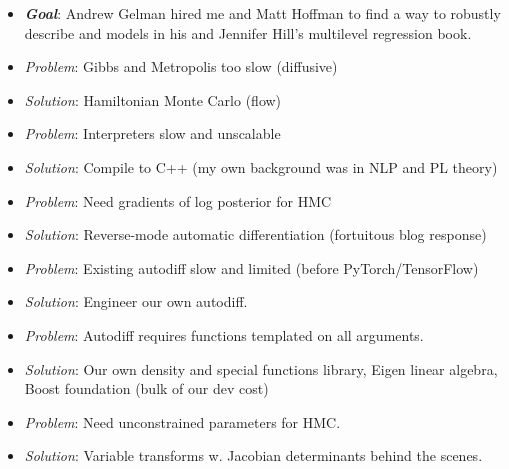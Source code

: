 \documentclass[10pt]{report}
\begin{document}
%
\begin{itemize}
\item {\slshape\bfseries Goal}: Andrew Gelman hired me and Matt Hoffman to find a way to robustly describe and models in his and Jennifer Hill's multilevel regression book.
\end{itemize}
%
\vspace*{2pt}
\begin{itemize}
\item {\slshape Problem}: Gibbs and Metropolis too slow (diffusive)
\item {\slshape Solution}: Hamiltonian Monte Carlo (flow)
%
\vspace*{8pt}
\item {\slshape Problem}:  Interpreters slow and unscalable
\item {\slshape Solution}: Compile to C++ (my own background was in NLP and PL theory)
%
\vspace*{8pt}
\item {\slshape Problem}:  Need gradients of log posterior for HMC
\item {\slshape Solution}: Reverse-mode automatic differentiation (fortuitous blog response)
\end{itemize}


%
\begin{itemize}
\item {\slshape Problem}:  Existing autodiff slow and limited (before PyTorch/TensorFlow)
\item {\slshape Solution}: Engineer our own autodiff.
%
\vspace*{8pt}
\item {\slshape Problem}:  Autodiff requires functions templated on
  all arguments.
\item {\slshape Solution}: Our own density and special functions library, Eigen linear algebra, Boost foundation (bulk of our dev cost)
%
\vspace*{8pt}
\item {\slshape Problem}:  Need unconstrained parameters for HMC.
\item {\slshape Solution}: Variable transforms w. Jacobian determinants behind the scenes.
%
\end{itemize}
\end{document}
